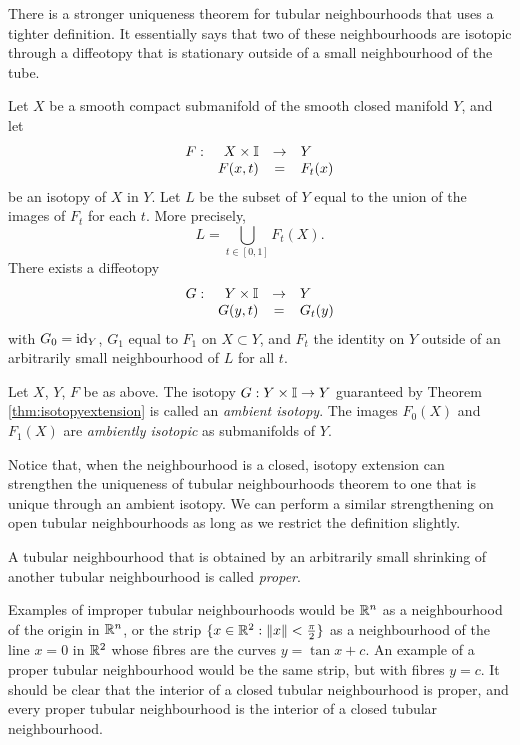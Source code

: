 There is a stronger uniqueness theorem for tubular neighbourhoods that uses a tighter definition.
It essentially says that two of these neighbourhoods are isotopic through a diffeotopy that is stationary outside of a small neighbourhood of the tube.

\begin{theorem}
	\label{thm:isotopyextension}
	Let $X$ be a smooth compact submanifold of the smooth closed manifold $Y$, and let
	\[
		\begin{array}{crcl}
			F: & X\times\mathbb{I} & \to & Y \\
			   & F(x,t) & = & F_t(x)
		\end{array}
	\]
	be an isotopy of $X$ in $Y$.
	Let $L$ be the subset of $Y$ equal to the union of the images of $F_t$ for each $t$.
	More precisely,
	\[
		L = \bigcup_{t\in[0,1]} F_t(X).
	\]
	There exists a diffeotopy 
	\[
		\begin{array}{crcl}
			G: & Y\times\mathbb{I} & \to & Y \\
			   & G(y,t) & = & G_t(y)				
		\end{array}
	\]
	with $G_0=\textrm{id}_{Y}$, $G_1$ equal to $F_1$ on $X\subset Y$, and $F_t$ the identity on $Y$ outside of an arbitrarily small neighbourhood of $L$ for all $t$.
\end{theorem}

\begin{defn}
	\label{def:ambientisotopy}
	Let $X$, $Y$, $F$ be as above.
	The isotopy $G:Y\times\mathbb{I}\to Y$ guaranteed by Theorem \ref{thm:isotopyextension} is called an \emph{ambient isotopy}.
	The images $F_0(X)$ and $F_1(X)$ are \emph{ambiently isotopic} as submanifolds of $Y$.
\end{defn}

Notice that, when the neighbourhood is a closed, isotopy extension can strengthen the uniqueness of tubular neighbourhoods theorem to one that is unique through an ambient isotopy.
We can perform a similar strengthening on open tubular neighbourhoods as long as we restrict the definition slightly.

\begin{defn}
	A tubular neighbourhood that is obtained by an arbitrarily small shrinking of another tubular neighbourhood is called \emph{proper}.
\end{defn}

Examples of improper tubular neighbourhoods would be $\mathbb{R}^n$ as a neighbourhood of the origin in $\mathbb{R}^n$, or the strip $\{ x\in \mathbb{R}^2 : \left\lVert x \right\rVert< \frac{\pi}{2}\}$ as a neighbourhood of the line $x=0$ in $\mathbb{R}^2$ whose fibres are the curves $y=\tan x + c$.
An example of a proper tubular neighbourhood would be the same strip, but with fibres $y=c$.
It should be clear that the interior of a closed tubular neighbourhood is proper, and every proper tubular neighbourhood is the interior of a closed tubular neighbourhood.

